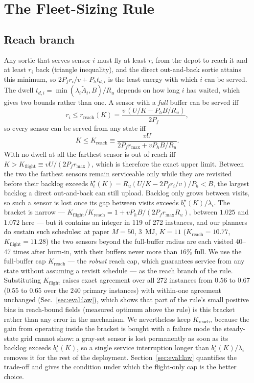 \documentclass[journal,outdir=./]{IEEEtran}
\newcommand{\Kr}{K_{\mathrm{reach}}}
\newcommand{\rmax}{r_{\max}}
\newcommand{\Pf}{P_{f}}
\newcommand{\Ph}{P_{h}}
\newcommand{\Ru}{R_u}
\begin{document}
\section{The Fleet-Sizing Rule}\label{sec:law}

\subsection{Reach branch}\label{sec:law:reach}
Any sortie that serves sensor $i$ must fly at least $r_i$ from the depot to reach it and at least $r_i$ back (triangle inequality), and the direct out-and-back sortie attains this minimum, so $2\Pf r_i/v+\Ph t_{d,i}$ is the least energy with which $i$ can be served. The dwell $t_{d,i}=\min(\lambda_i\tilde A_i,B)/\Ru$ depends on how long $i$ has waited, which gives two bounds rather than one. A sensor with a \emph{full} buffer can be served iff
\begin{equation}\label{eq:rreach}
r_i\le r_{\mathrm{reach}}(K)=\frac{v\,(U/K-\Ph B/\Ru)}{2\Pf},
\end{equation}
so every sensor can be served from any state iff
\begin{equation}\label{eq:Kreach}
K\le\Kr\equiv\frac{vU}{2\Pf\rmax+v\Ph B/\Ru}.
\end{equation}
With no dwell at all the farthest sensor is out of reach iff $K>K_{\mathrm{flight}}\equiv vU/(2\Pf\rmax)$, which is therefore the exact upper limit. Between the two the farthest sensors remain serviceable only while they are revisited before their backlog exceeds $b^{\star}_i(K)=\Ru(U/K-2\Pf r_i/v)/\Ph<B$, the largest backlog a direct out-and-back can still upload. Backlog only grows between visits, so such a sensor is lost once its gap between visits exceeds $b^{\star}_i(K)/\lambda_i$. The bracket is narrow --- $K_{\mathrm{flight}}/\Kr=1+v\Ph B/(2\Pf\rmax\Ru)$, between $1.025$ and $1.072$ here --- but it contains an integer in 119 of 272 instances, and our planners do sustain such schedules: at paper $M=50$, 3~MJ, $K=11$ ($\Kr=10.77$, $K_{\mathrm{flight}}=11.28$) the two sensors beyond the full-buffer radius are each visited 40--47 times after burn-in, with their buffers never more than $16\%$ full. We use the full-buffer cap $\Kr$ --- the \emph{robust} reach cap, which guarantees service from any state without assuming a revisit schedule --- as the reach branch of the rule. Substituting $K_{\mathrm{flight}}$ raises exact agreement over all 272 instances from $0.56$ to $0.67$ ($0.55$ to $0.65$ over the 240 primary instances) with within-one agreement unchanged (Sec.~\ref{sec:eval:law}), which shows that part of the rule's small positive bias in reach-bound fields (measured optimum above the rule) is this bracket rather than any error in the mechanism. We nevertheless keep $\Kr$, because the gain from operating inside the bracket is bought with a failure mode the steady-state grid cannot show: a gray-set sensor is lost permanently as soon as its backlog exceeds $b^{\star}_i(K)$, so a single service interruption longer than $b^{\star}_i(K)/\lambda_i$ removes it for the rest of the deployment. Section~\ref{sec:eval:law} quantifies the trade-off and gives the condition under which the flight-only cap is the better choice.
\end{document}
